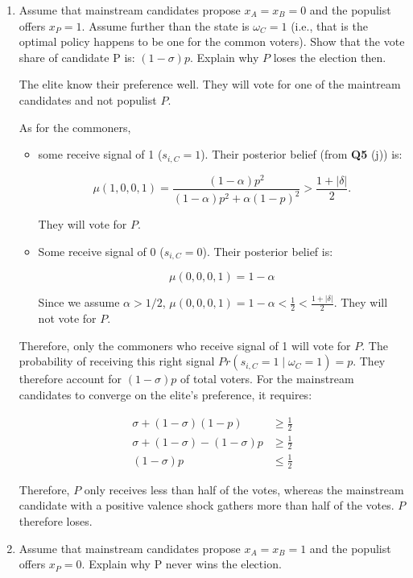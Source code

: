 \documentclass[
  letterpaper,
  abstract=true]{scrartcl}
\begin{document}
\begin{enumerate}
  \color{black}
\item
  Assume that mainstream candidates propose \(x_A=x_B=0\) and the
  populist offers \(x_P =1\). Assume further than the state is
  \(\omega_C = 1\) (i.e., that is the optimal policy happens to be one
  for the common voters). Show that the vote share of candidate P is:
  \((1 − \sigma)p\). Explain why \(P\) loses the election then.

  \color{blue}

  The elite know their preference well. They will vote for one of the
  maintream candidates and not populist \(P\).

  As for the commoners,

  \begin{itemize}
  \item
    some receive signal of 1 (\(s_{i,C}=1\)). Their posterior belief
    (from \textbf{Q5} (j)) is:

    \[
    \mu(1,0,0,1)=\frac{(1-\alpha)p^2}{(1-\alpha)p^2+\alpha(1-p)^2}>\frac{1+|\delta|}{2}.
    \]

    They will vote for \(P\).
  \item
    Some receive signal of 0 (\(s_{i,C}=0\)). Their posterior belief is:

    \[
    \mu(0,0,0,1)=1-\alpha
    \]

    Since we assume \(\alpha>1/2\),
    \(\mu(0,0,0,1)=1-\alpha<\frac{1}{2}<\frac{1+|\delta|}{2}\). They
    will not vote for \(P\).
  \end{itemize}

  Therefore, only the commoners who receive signal of 1 will vote for
  \(P\). The probability of receiving this right signal
  \(Pr(s_{i,C}=1\mid \omega_C=1)=p\). They therefore account for
  \((1-\sigma)p\) of total voters. For the mainstream candidates to
  converge on the elite's preference, it requires:

  \begin{align*}
  \sigma+(1-\sigma)(1-p)&\geq\frac{1}{2} \\
  \sigma+(1-\sigma)-(1-\sigma)p&\geq\frac{1}{2} \\
  (1-\sigma)p&\leq\frac{1}{2}
  \end{align*}

  Therefore, \(P\) only receives less than half of the votes, whereas
  the mainstream candidate with a positive valence shock gathers more
  than half of the votes. \(P\) therefore loses.

  \color{black}
\item
  Assume that mainstream candidates propose \(x_A = x_B = 1\) and the
  populist offers \(x_P = 0\). Explain why P never wins the election.


\end{enumerate}
\end{document}
